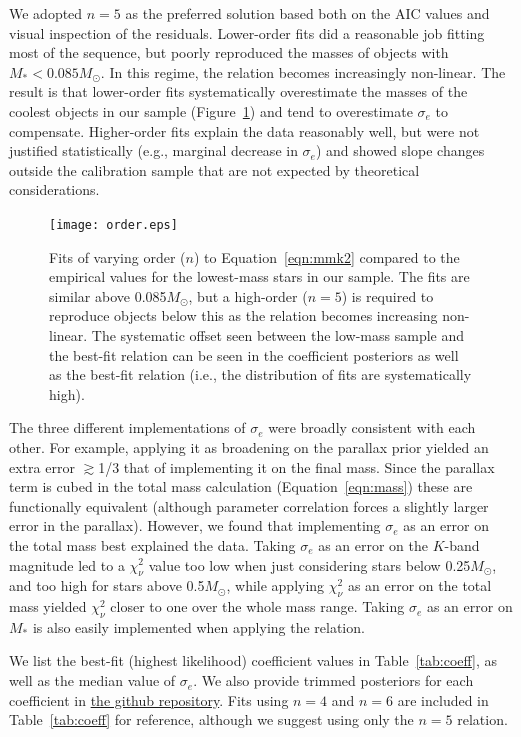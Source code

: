 \documentclass[twocolumn]{aastex62}
\newcommand{\order}{5}
\begin{document}
We adopted $n=\order$ as the preferred solution based both on the AIC values and visual inspection of the residuals. Lower-order fits did a reasonable job fitting most of the sequence, but poorly reproduced the masses of objects with $M_*<0.085M_\odot$. In this regime, the relation becomes increasingly non-linear. The result is that lower-order fits systematically overestimate the masses of the coolest objects in our sample (Figure~\ref{fig:order}) and tend to overestimate $\sigma_e$ to compensate. Higher-order fits explain the data reasonably well, but were not justified statistically (e.g., marginal decrease in $\sigma_e$) and showed slope changes outside the calibration sample that are not expected by theoretical considerations. 

\begin{figure}[h]
\begin{center}
\texttt{[image: order.eps]}
\caption{Fits of varying order ($n$) to Equation~\ref{eqn:mmk2} compared to the empirical values for the lowest-mass stars in our sample. The fits are similar above 0.085$M_\odot$, but a high-order ($n=\order$) is required to reproduce objects below this as the relation becomes increasing non-linear. The systematic offset seen between the low-mass sample and the best-fit relation can be seen in the coefficient posteriors as well as the best-fit relation (i.e., the distribution of fits are systematically high). }
\label{fig:order}
\end{center}
\end{figure}

The three different implementations of $\sigma_e$ were broadly consistent with each other. For example, applying it as broadening on the parallax prior yielded an extra error $\gtrsim$1/3 that of implementing it on the final mass. Since the parallax term is cubed in the total mass calculation (Equation~\ref{eqn:mass}) these are functionally equivalent (although parameter correlation forces a slightly larger error in the parallax). However, we found that implementing $\sigma_e$ as an error on the total mass best explained the data. Taking $\sigma_e$ as an error on the $K$-band magnitude led to a $\chi^2_\nu$ value too low when just considering stars below 0.25$M_\odot$, and too high for stars above 0.5$M_\odot$, while applying $\chi^2_\nu$ as an error on the total mass yielded $\chi^2_\nu$ closer to one over the whole mass range. Taking $\sigma_e$ as an error on $M_*$ is also easily implemented when applying the relation. 

We list the best-fit (highest likelihood) coefficient values in Table~\ref{tab:coeff}, as well as the median value of $\sigma_e$. We also provide trimmed posteriors for each coefficient in \href{https://github.com/awmann/M_-M_K-}{the github repository}. Fits using $n=4$ and $n=6$ are included in Table~\ref{tab:coeff} for reference, although we suggest using only the $n=\order$ relation. 
\end{document}

